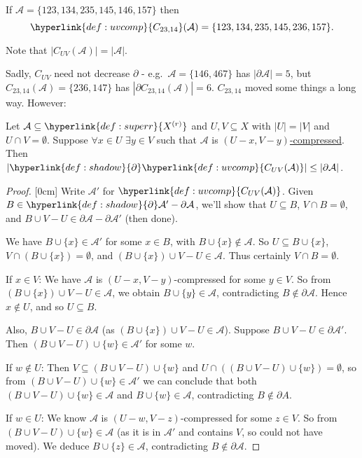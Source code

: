 \documentclass{article}
\newcommand{\A}{\mathcal{A}}
\let\subset\subseteq
\begin{document}
\begin{eg}
  If $\mathcal{A} = \{123,134,235,145,146,157\}$ then
  \begin{equation*}\hyperlink{def:uvcomp}{C_{23,14}}(\mathcal{A}) = \{123,134,235,145,236,157\}.\end{equation*}
\end{eg}
Note that $|C_{UV}(\mathcal{A})| = |\mathcal{A}|$.

Sadly, \hyperlink{def:uvcomp}{$C_{UV}$} need not decrease \hyperlink{def:shadow}{$\partial$} - e.g.\ $\mathcal{A} = \{146,467\}$ has $|\partial\mathcal{A}| = 5$, but $C_{23,14}(\mathcal{A}) = \{236,147\}$ has $|\partial C_{23,14}(\mathcal{A})| = 6$.
$C_{23,14}$ moved some things a long way.
However:
\begin{nprop}\label{prop:6}
  Let $\mathcal{A} \subset \hyperlink{def:superr}{X^{(r)}}$ and $U,V \subseteq X$ with $|U| = |V|$ and $U \cap V = \emptyset$.
  Suppose $\forall x \in U$ $\exists y \in V$ such that $\mathcal{A}$ is \hyperlink{def:uvcomp}{$(U-x, V-y)$-compressed}.
  Then $|\hyperlink{def:shadow}{\partial} \hyperlink{def:uvcomp}{C_{UV}(\mathcal{A})}| \leq |\partial \mathcal{A}|$.
\end{nprop}
\begin{proof}
  [0cm]
  \color{gray}
  Write $\mathcal{A}'$ for $\hyperlink{def:uvcomp}{C_{UV}(\mathcal{A})}$.
  Given $B \in \hyperlink{def:shadow}{\partial} \A' - \partial \A$, we'll show that $U \subset B$, $V \cap B = \emptyset$, and $B \cup V - U \in \partial \A - \partial \A'$ (then done).

  We have $B \cup \{x\} \in \mathcal{A}'$ for some $x \in B$, with $B \cup \{x\} \notin \mathcal{A}$.
  So $U \subset B \cup \{x\}$, $V \cap (B \cup \{x\}) = \emptyset$, and $(B \cup \{x\}) \cup V - U \in \mathcal{A}$.
  Thus certainly $V \cap B = \emptyset$.\bigskip

  If $x \in V$: We have $\mathcal{A}$ is $(U-x,V-y)$-compressed for some $y \in V$.
  So from $(B \cup \{x\}) \cup V - U \in \mathcal{A}$, we obtain $B \cup \{y\} \in \mathcal{A}$,
  contradicting $B \notin \partial \mathcal{A}$.
  Hence $x \notin U$, and so $U \subset B$. \bigskip

  Also, $B \cup V - U \in \partial \mathcal{A}$ (as $(B \cup \{x\}) \cup V - U \in \mathcal{A}$).
  Suppose $B \cup V - U \in \partial \mathcal{A}'$.
  Then $(B \cup V - U) \cup \{w\} \in \mathcal{A}'$ for some $w$.

  If $w \notin U$: Then $V \subset (B \cup V - U) \cup \{w\}$ and $U \cap ((B \cup V - U) \cup \{w\}) = \emptyset$, so from $(B \cup V - U) \cup \{w\} \in \mathcal{A}'$ we can conclude that both $(B \cup V - U) \cup \{w\} \in \mathcal{A}$ and $B \cup \{w\} \in \mathcal{A}$, contradicting $B \notin \partial A.$

  If $w \in U$: We know $\mathcal{A}$ is $(U-w,V-z)$-compressed for some $z \in V$.
  So from $(B \cup V - U) \cup \{w\} \in \mathcal{A}$ (as it is in $\mathcal{A}'$ and contains $V$, so could not have moved).
  We deduce $B \cup \{z\} \in \mathcal{A}$, contradicting $B \notin \partial \mathcal{A}$.
\end{proof}
\end{document}
